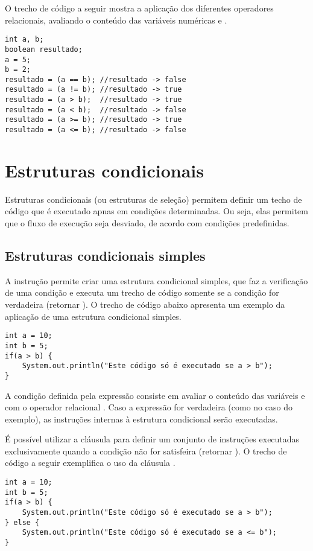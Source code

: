 O trecho de código a seguir mostra a aplicação dos diferentes operadores relacionais, avaliando o conteúdo das variáveis numéricas  e .

\begin{verbatim}
int a, b;
boolean resultado;
a = 5;
b = 2;
resultado = (a == b); //resultado -> false
resultado = (a != b); //resultado -> true
resultado = (a > b);  //resultado -> true
resultado = (a < b);  //resultado -> false
resultado = (a >= b); //resultado -> true
resultado = (a <= b); //resultado -> false
\end{verbatim}

\section{Estruturas condicionais}
Estruturas condicionais (ou estruturas de seleção) permitem definir um techo de código que é executado apnas em condições determinadas. Ou seja, elas permitem que o fluxo de execução seja desviado, de acordo com condições predefinidas.

\subsection{Estruturas condicionais simples}
A instrução  permite criar uma estrutura condicional simples, que faz a verificação de uma condição e executa um trecho de código somente se a condição for verdadeira (retornar ). O trecho de código abaixo apresenta um exemplo da aplicação de uma estrutura condicional simples.

\begin{verbatim}
int a = 10;
int b = 5;
if(a > b) {
	System.out.println("Este código só é executado se a > b");
}
\end{verbatim}

A condição definida pela expressão  consiste em avaliar o conteúdo das variáveis  e  com o operador relacional \code{>}. Caso a expressão  for verdadeira (como no caso do exemplo), as instruções internas à estrutura condicional serão executadas.

É possível utilizar a cláusula  para definir um conjunto de instruções executadas exclusivamente quando a condição não for satisfeira (retornar ). O trecho de código a seguir exemplifica o uso da cláusula .

\begin{verbatim}
int a = 10;
int b = 5;
if(a > b) {
	System.out.println("Este código só é executado se a > b");
} else {
	System.out.println("Este código só é executado se a <= b");
}
\end{verbatim}

